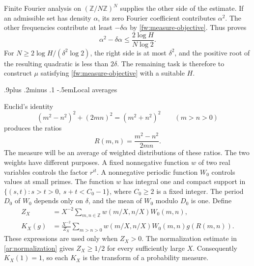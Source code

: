 \documentclass[twoside]{aomart}
\makeatletter
\theoremstyle{paperplain}
\theoremstyle{paperdefinition}
\renewcommand\subsection{\@startsection{subsection}{2}{\z@}
  {.9\baselineskip plus .2\baselineskip minus .1\baselineskip}
  {-.5em}{\normalfont\bfseries}}
\newcommand{\Z}{\mathbb Z}
\numberwithin{equation}{section}
\makeatother
\begin{document}
Finite Fourier analysis on $(\Z/N\Z)^N$ supplies the other side of
the estimate. If an admissible set has density $\alpha$, its zero
Fourier coefficient contributes $\alpha^2$. The other frequencies
contribute at least $-\delta\alpha$ by
\eqref{fw:measure-objective}. Thus  proves
\begin{equation*}
 \alpha^2-\delta\alpha
 \le\frac{2\log H}{N\log2}.
\end{equation*}
For $N\ge2\log H/(\delta^2\log2)$, the right side is at most
$\delta^2$, and the positive root of the resulting quadratic is
less than $2\delta$. The remaining task is therefore to construct
$\mu$ satisfying \eqref{fw:measure-objective} with a suitable $H$.

\subsection{Local averages}

Euclid's identity
\begin{equation*}
 (m^2-n^2)^2+(2mn)^2=(m^2+n^2)^2
 \qquad(m>n>0)
\end{equation*}
produces the ratios
\begin{equation*}
 R(m,n)=\frac{m^2-n^2}{2mn}.
\end{equation*}
The measure will be an average of weighted distributions of these
ratios. The two weights have different purposes. A fixed nonnegative
function $w$ of two real variables controls the factor $r^{it}$.
A nonnegative periodic function $W_0$ controls values at small
primes. The function $w$ has integral one and compact support in
$\{(s,t):s>t>0,\ s+t<C_0-1\}$, where $C_0\ge2$ is a fixed integer.
The period $D_0$ of $W_0$ depends only on $\delta$, and the mean of
$W_0$ modulo $D_0$ is one. Define
\begin{equation*}
 \begin{aligned}
 Z_X&=X^{-2}\sum_{m,n\in\Z}w(m/X,n/X)W_0(m,n),\\
 K_X(g)&=\frac{X^{-2}}{Z_X}
       \sum_{m>n>0}w(m/X,n/X)W_0(m,n)g(R(m,n)).
 \end{aligned}
\end{equation*}
These expressions are used only when $Z_X>0$. The normalization
estimate in \eqref{ar:normalization} gives $Z_X\ge1/2$ for every
sufficiently large $X$. Consequently $K_X(1)=1$, so each $K_X$
is the transform of a probability measure.
\end{document}
